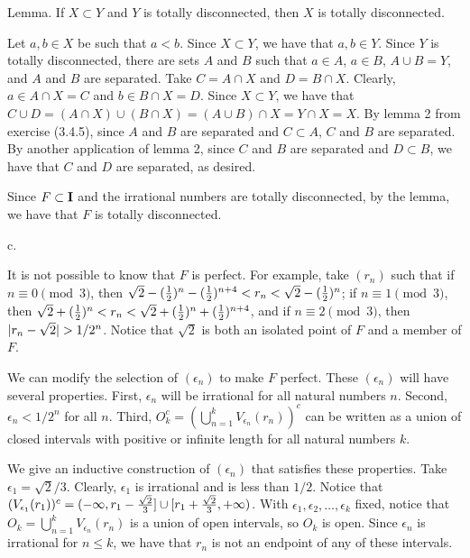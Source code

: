 \proclaim Lemma. If $X \subset Y$ and $Y$ is totally disconnected,
then $X$ is totally disconnected.

Let $a, b \in X$ be such that $a < b$.
Since $X \subset Y$, we have that $a, b \in Y$.
Since $Y$ is totally disconnected, there are sets $A$ and $B$
such that $a \in A$, $a \in B$, $A \cup B = Y$, and $A$ and $B$ are separated.
Take $C = A \cap X$ and $D = B \cap X$.
Clearly, $a \in A \cap X = C$ and $b \in B \cap X = D$.
Since $X \subset Y$, we have that $C \cup D = (A \cap X) \cup (B \cap X) =
(A \cup B) \cap X = Y \cap X = X$.
By lemma 2 from exercise (3.4.5), since $A$ and $B$ are separated
and $C \subset A$, $C$ and $B$ are separated.
By another application of lemma 2, since $C$ and $B$ are separated
and $D \subset B$, we have that $C$ and $D$ are separated, as desired.

Since $F \subset {\bf I}$ and
the irrational numbers are totally disconnected,
by the lemma, we have that $F$ is totally disconnected.
\medskip
\item{} c.

It is not possible to know that $F$ is perfect.
For example, take $(r_n)$ such that
if $n \equiv 0 \pmod 3$, then
$\sqrt 2 - ({1 \over 2})^n - ({1 \over 2})^{n+4} < r_n <
\sqrt 2 - ({1 \over 2})^n$;
if $n \equiv 1 \pmod 3$, then
$\sqrt 2 + ({1 \over 2})^n < r_n <
\sqrt 2 + ({1 \over 2})^n + ({1 \over 2})^{n+4}$,
and if $n \equiv 2 \pmod 3$, then $\vert r_n - \sqrt 2\vert > 1/2^n$.
Notice that $\sqrt 2$ is both an isolated point of $F$ and a member of $F$.

We can modify the selection of $(\epsilon _n)$
to make $F$ perfect.
These $(\epsilon _n)$ will have several properties.
First, $\epsilon _n$ will be irrational for all natural numbers $n$.
Second, $\epsilon _n < 1 / 2^n$ for all $n$.
Third, $O_k^c = (\bigcup _{n=1} ^k V _{\epsilon _n} (r_n))^c$
can be written as a union of closed intervals with positive
or infinite length for all natural numbers $k$.

We give an inductive construction of $(\epsilon _n)$
that satisfies these properties.
Take $\epsilon _1 = \sqrt 2 / 3$.
Clearly, $\epsilon _1$ is irrational and is less than $1/2$.
Notice that $(V _{\epsilon _1} (r_1))^c =
(-\infty, r_1 - {\sqrt 2 \over 3}] \cup [r_1 + {\sqrt 2 \over 3}, +\infty)$.
With $\epsilon _1, \epsilon _2, \ldots, \epsilon _k$ fixed,
notice that $O_k = \bigcup _{n=1} ^k V _{\epsilon _n} (r_n)$
is a union of open intervals, so $O_k$ is open.
Since $\epsilon _n$ is irrational for $n \le k$,
we have that $r_n$ is not an endpoint of any of these intervals.

